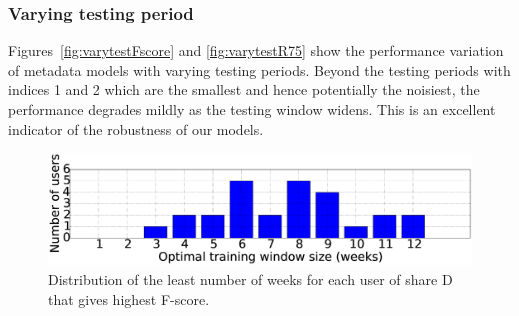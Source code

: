 \subsubsection{Varying testing period}
Figures~\ref{fig:varytestFscore} and \ref{fig:varytestR75} show the
performance variation of metadata models with varying testing periods.
Beyond the testing periods with indices 1 and 2 which are the smallest
and hence potentially the noisiest, the performance degrades mildly as
the testing window widens.  This is an excellent indicator of the
robustness of our models.


\begin{figure}[!htbp]
\begin{center}
\centering
\includegraphics[width=0.95\linewidth]{FileAccess/figs/histogram_leastbestweekfscore6216New}
\caption{Distribution of the least number of weeks for each user of share D that gives highest F-score. } 
\label{fig:histBestLeastWeek6216}
\end{center}
\end{figure}

